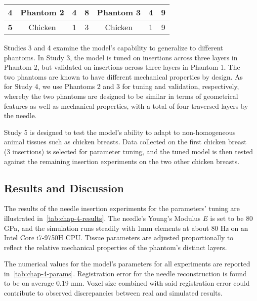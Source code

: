 \begin{table}[h]
{\begin{tabular}{c|ccc|ccc|}
\multicolumn{1}{|c|}{\textbf{4}}                  & \multicolumn{1}{c|}{Phantom 2}                  & \multicolumn{1}{c|}{4}                  & 8                    & \multicolumn{1}{c|}{Phantom 3}                  & \multicolumn{1}{c|}{4}               & 9                    \\ \hline
\multicolumn{1}{|c|}{\textbf{5}}                  & \multicolumn{1}{c|}{Chicken}                    & \multicolumn{1}{c|}{1}                  & 3                    & \multicolumn{1}{c|}{Chicken}                    & \multicolumn{1}{c|}{1}               & 9                    \\ \hline
\end{tabular}%
}
\end{table}

Studies 3 and 4 examine the model's capability to generalize to different phantoms. In Study 3, the model is tuned on insertions across three layers in Phantom 2, but validated on insertions across three layers in Phantom 1. The two phantoms are known to have different mechanical properties by design. As for Study 4, we use Phantoms 2 and 3 for tuning and validation, respectively, whereby the two phantoms are designed to be similar in terms of geometrical features as well as mechanical properties, with a total of four traversed layers by the needle.

Study 5 is designed to test the model's ability to adapt to non-homogeneous animal tissues such as chicken breasts. Data collected on the first chicken breast (3 insertions) is selected for parameter tuning, and the tuned model is then tested against the remaining insertion experiments on the two other chicken breasts.

\subsection{Results and Discussion}
\label{sec:chap-4-results-and-discussion}

The results of the needle insertion experiments for the parameters' tuning are illustrated in~\cref{tab:chap-4-results}. The needle's Young's Modulus $E$ is set to be 80 GPa, and the simulation runs steadily with 1mm elements at about 80 Hz on an Intel Core i7-9750H CPU. Tissue parameters are adjusted proportionally to reflect the relative mechanical properties of the phantom's distinct layers.

The numerical values for the model's parameters for all experiments are reported in~\cref{tab:chap-4-params}. Registration error for the needle reconstruction is found to be on average 0.19 mm. Voxel size combined with said registration error could contribute to observed discrepancies between real and simulated results.

